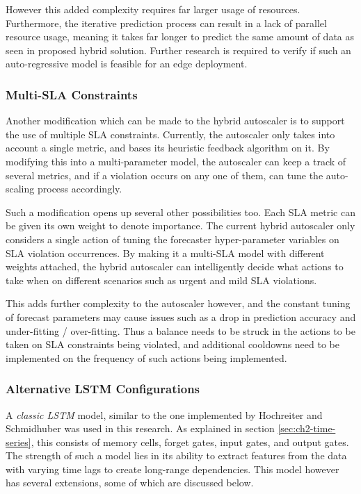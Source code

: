 However this added complexity requires far larger usage of resources. Furthermore, the iterative prediction process can result in a lack of parallel resource usage, meaning it takes far longer to predict the same amount of data as seen in proposed hybrid solution. Further research is required to verify if such an auto-regressive model is feasible for an edge deployment.

\subsubsection{Multi-SLA Constraints}
\label{subsubsec:ch6-multi-sla}

Another modification which can be made to the hybrid autoscaler is to support the use of multiple SLA constraints. Currently, the autoscaler only takes into account a single metric, and bases its heuristic feedback algorithm on it. By modifying this into a multi-parameter model, the autoscaler can keep a track of several metrics, and if a violation occurs on any one of them, can tune the auto-scaling process accordingly.\par

Such a modification opens up several other possibilities too. Each SLA metric can be given its own weight to denote importance. The current hybrid autoscaler only considers a single action of tuning the forecaster hyper-parameter variables on SLA violation occurrences. By making it a multi-SLA model with different weights attached, the hybrid autoscaler can intelligently decide what actions to take when on different scenarios such as urgent and mild SLA violations.\par

This adds further complexity to the autoscaler however, and the constant tuning of forecast parameters may cause issues such as a drop in prediction accuracy and under-fitting / over-fitting. Thus a balance needs to be struck in the actions to be taken on SLA constraints being violated, and additional cooldowns need to be implemented on the frequency of such actions being implemented.

\subsubsection{Alternative LSTM Configurations}
\label{subsubsec:ch6-advanced-lstm-config}

A \textit{classic LSTM} model, similar to the one implemented by Hochreiter and Schmidhuber \cite{hochreiter1997long} was used in this research. As explained in section \ref{sec:ch2-time-series}, this consists of memory cells, forget gates, input gates, and output gates. The strength of such a model lies in its ability to extract features from the data with varying time lags to create long-range dependencies. This model however has several extensions, some of which are discussed below.\par

